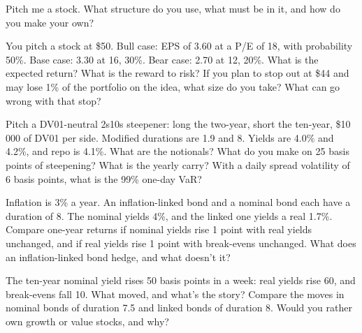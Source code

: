 \begin{question}\label{iq:iv2:macro-market-knowledge-and-pitches:17}
Pitch me a stock. What structure do you use, what must be in it, and how do you make your own?
\end{question}

\begin{question}\label{iq:iv2:macro-market-knowledge-and-pitches:18}
You pitch a stock at \$50. Bull case: EPS of 3.60 at a P/E of 18, with probability 50\%. Base case: 3.30 at 16, 30\%. Bear case: 2.70 at 12, 20\%. What is the expected return? What is the reward to risk? If you plan to stop out at \$44 and may lose 1\% of the portfolio on the idea, what size do you take? What can go wrong with that stop?
\end{question}

\begin{question}\label{iq:iv2:macro-market-knowledge-and-pitches:19}
Pitch a DV01-neutral 2s10s steepener: long the two-year, short the ten-year, \$10\,000 of DV01 per side. Modified durations are 1.9 and 8. Yields are 4.0\% and 4.2\%, and repo is 4.1\%. What are the notionals? What do you make on 25 basis points of steepening? What is the yearly carry? With a daily spread volatility of 6 basis points, what is the 99\% one-day VaR?
\end{question}

\begin{question}\label{iq:iv2:macro-market-knowledge-and-pitches:20}
Inflation is 3\% a year. An inflation-linked bond and a nominal bond each have a duration of 8. The nominal yields 4\%, and the linked one yields a real 1.7\%. Compare one-year returns if nominal yields rise 1 point with real yields unchanged, and if real yields rise 1 point with break-evens unchanged. What does an inflation-linked bond hedge, and what doesn't it?
\end{question}

\begin{question}\label{iq:iv2:macro-market-knowledge-and-pitches:21}
The ten-year nominal yield rises 50 basis points in a week: real yields rise 60, and break-evens fall 10. What moved, and what's the story? Compare the moves in nominal bonds of duration 7.5 and linked bonds of duration 8. Would you rather own growth or value stocks, and why?
\end{question}

